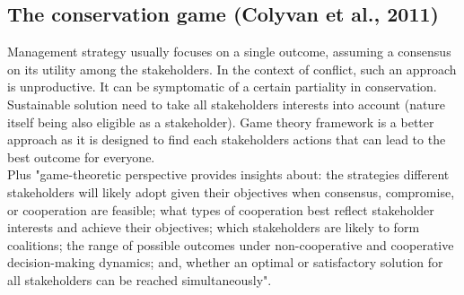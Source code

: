 \documentclass[12pt]{article}
\begin{document}
\subsection{The conservation game (Colyvan et al., 2011)}

Management strategy usually focuses on a single outcome, assuming a consensus on its utility among the stakeholders. In the context of conflict, such an approach is unproductive. It can be symptomatic of a certain partiality in conservation. Sustainable solution need to take all stakeholders interests into account (nature itself being also eligible as a stakeholder). Game theory framework is a better approach as it is designed to find each stakeholders actions that can lead to the best outcome for everyone.\\ 
Plus "game-theoretic perspective provides insights about: the strategies different stakeholders will likely adopt given their objectives when consensus, compromise, or cooperation are feasible; what types of cooperation best reflect stakeholder interests and achieve their objectives; which stakeholders are likely to form coalitions; the range of possible outcomes under non-cooperative and cooperative decision-making dynamics; and, whether an optimal or satisfactory solution for all stakeholders can be reached simultaneously".\\
\end{document}
